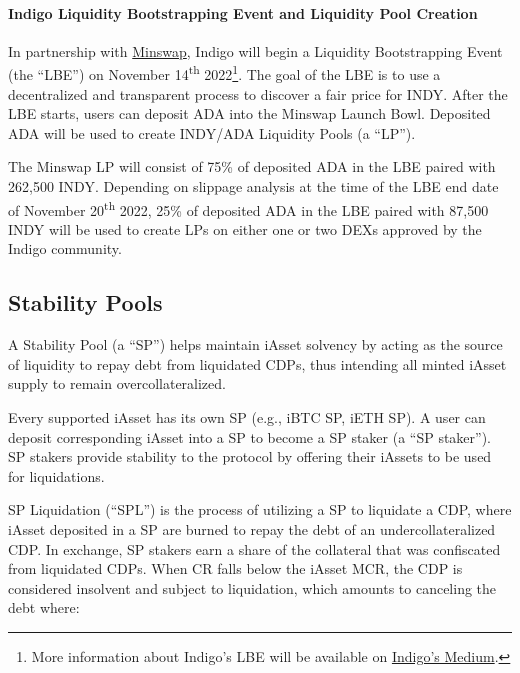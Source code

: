\documentclass{article}
\begin{document}
\begin{sloppypar}
\hypertarget{indigo-liquidity-bootstrapping-event-and-liquidity-pool-creation}{%
\paragraph{Indigo Liquidity Bootstrapping Event and Liquidity Pool
Creation}\label{indigo-liquidity-bootstrapping-event-and-liquidity-pool-creation}}

In partnership with \href{https://minswap.org/}{Minswap}, Indigo will
begin a Liquidity Bootstrapping Event (the ``LBE'') on November
14\textsuperscript{th} 2022\footnote{More information about Indigo's LBE
  will be available on
  \href{https://indigoprotocol1.medium.com/}{Indigo's Medium}.}. The
goal of the LBE is to use a decentralized and transparent process to
discover a fair price for INDY. After the LBE starts, users can deposit
ADA into the Minswap Launch Bowl. Deposited ADA will be used to create
INDY/ADA Liquidity Pools (a ``LP'').

The Minswap LP will consist of 75\% of deposited ADA in the LBE paired
with 262,500 INDY. Depending on slippage analysis at the time of the LBE
end date of November 20\textsuperscript{th} 2022, 25\% of deposited ADA
in the LBE paired with 87,500 INDY will be used to create LPs on either
one or two DEXs approved by the Indigo community.

\hypertarget{stability-pools}{%
\subsection{Stability Pools}\label{stability-pools}}

A Stability Pool (a ``SP'') helps maintain iAsset solvency by acting as
the source of liquidity to repay debt from liquidated CDPs, thus
intending all minted iAsset supply to remain overcollateralized.

Every supported iAsset has its own SP (e.g., iBTC SP, iETH SP). A user
can deposit corresponding iAsset into a SP to become a SP staker (a ``SP
staker''). SP stakers provide stability to the protocol by offering
their iAssets to be used for liquidations.

SP Liquidation (``SPL'') is the process of utilizing a SP to liquidate a
CDP, where iAsset deposited in a SP are burned to repay the debt of an
undercollateralized CDP. In exchange, SP stakers earn a share of the
collateral that was confiscated from liquidated CDPs. When CR falls
below the iAsset MCR, the CDP is considered insolvent and subject to
liquidation, which amounts to canceling the debt where:


\end{sloppypar}
\end{document}
